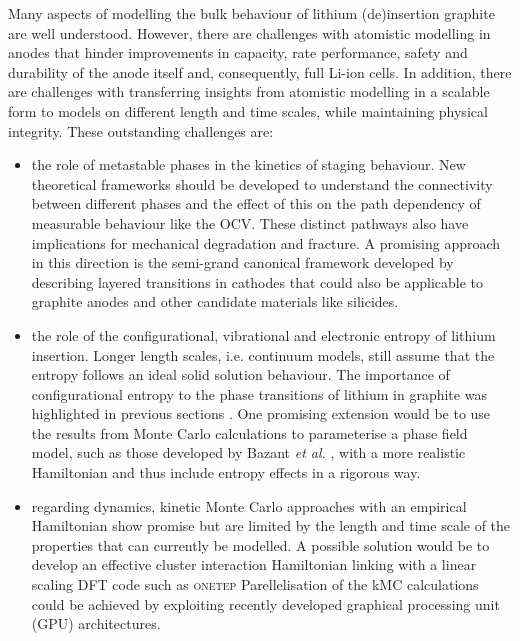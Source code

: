 \documentclass[../main.tex]{subfiles}
\begin{document}
Many aspects of modelling the bulk behaviour of lithium (de)insertion graphite are well understood. However, there are challenges with atomistic modelling in anodes that hinder improvements in capacity, rate performance, safety and durability of the anode itself and, consequently, full Li-ion cells. In addition, there are challenges with transferring insights from atomistic modelling in a scalable form to models on different length and time scales, while maintaining physical integrity. These outstanding challenges are:
    \begin{itemize}
        \item the role of metastable phases in the kinetics of staging behaviour. New theoretical frameworks should be developed to understand the connectivity between different phases and the effect of this on the path dependency of measurable behaviour like the OCV. These distinct pathways also have implications for mechanical degradation and fracture. A promising approach in this direction is the semi-grand canonical framework developed by \citeauthor{VanderVen2020,vanderven2018} describing layered transitions in cathodes \cite{VanderVen2020,radin_role_2017,Vinck2016,vanderven2018} that could also be applicable to graphite anodes and other candidate materials like silicides. 
        \item the role of the configurational, vibrational and electronic entropy of lithium insertion. Longer length scales, i.e. continuum models, still assume that the entropy follows an ideal solid solution behaviour. The importance of configurational entropy to the phase transitions of lithium in graphite was highlighted in previous sections \cite{Mercer2019,Mercer2021,REYNIER2003850}. One promising extension would be to use the results from Monte Carlo calculations to parameterise a phase field model, such as those developed by Bazant \textit{et al.} \cite{Bazant2017,guo2016,peng2011}, with a more realistic Hamiltonian and thus include entropy effects in a rigorous way.
        \item regarding dynamics, kinetic Monte Carlo approaches with an empirical Hamiltonian show promise \cite{gavilan-arriazu_kinetic_2020,gavilan-arriazu_effect_2020,GAVILANARRIAZU2018133} but are limited by the length and time scale of the properties that can currently be modelled. A possible solution would be to develop an effective cluster interaction Hamiltonian linking with a linear scaling DFT code such as \textsc{onetep} Parellelisation of the kMC calculations could be achieved by exploiting recently developed graphical processing unit (GPU) architectures.
    \end{itemize}
\end{document}
